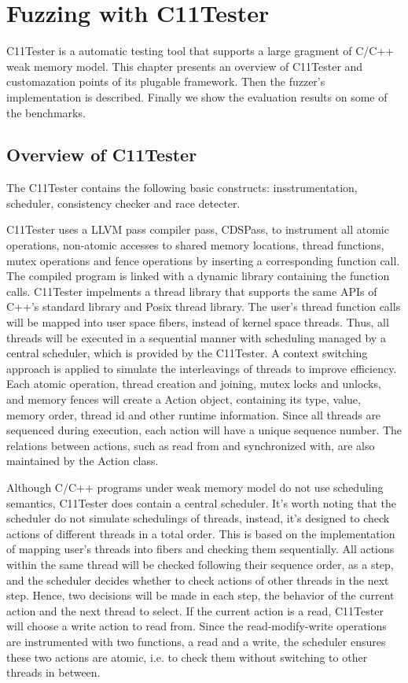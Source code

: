 \chapter{\label{cha:c11tester}Fuzzing with C11Tester}

C11Tester is a automatic testing tool that supports a large gragment of C/C++ weak memory model. This chapter presents an overview of C11Tester and customazation points of its plugable framework. Then the fuzzer's implementation is described. Finally we show the evaluation results on some of the benchmarks.

\section{Overview of C11Tester}

The C11Tester contains the following basic constructs: insstrumentation, scheduler, consistency checker and race detecter.

C11Tester uses a LLVM pass compiler pass, CDSPass, to instrument all atomic operations, non-atomic accesses to shared memory locations, thread functions, mutex operations and fence operations by inserting a corresponding function call. The compiled program is linked with a dynamic library containing the function calls.
C11Tester impelments a thread library that supports the same APIs of C++'s standard library and Posix thread library. The user's thread function calls will be mapped into user space fibers, instead of kernel space threads. Thus, all threads will be executed in a sequential manner with scheduling managed by a central scheduler, which is provided by the C11Tester. A context switching approach is applied to simulate the interleavings of threads to improve efficiency.
Each atomic operation, thread creation and joining, mutex locks and unlocks, and memory fences will create a Action object, containing its type, value, memory order, thread id and other runtime information. Since all threads are sequenced during execution, each action will have a unique sequence number. The relations between actions, such as read from and synchronized with, are also maintained by the Action class.

Although C/C++ programs under weak memory model do not use scheduling semantics, C11Tester does contain a central scheduler. It's worth noting that the scheduler do not simulate schedulings of threads, instead, it's designed to check actions of different threads in a total order. This is based on the implementation of mapping user's threads into fibers and checking them sequentially. All actions within the same thread will be checked following their sequence order, as a step, and the scheduler decides whether to check actions of other threads in the next step. Hence, two decisions will be made in each step, the behavior of the current action and the next thread to select. If the current action is a read, C11Tester will choose a write action to read from. Since the read-modify-write operations are instrumented with two functions, a read and a write, the scheduler ensures these two actions are atomic, i.e. to check them without switching to other threads in between.

